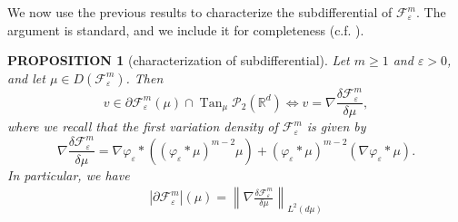 \documentclass[11pt,leqno]{amsart}
\newtheorem{prop}[thm]{PROPOSITION}
\theoremstyle{definition}
\newcommand{\be}{\begin{equation}}
\newcommand{\ee}{\end{equation}}
\newcommand{\bes}{\begin{equation*}}
\newcommand{\ees}{\end{equation*}}
\newcommand{\R}{{\mathord{\mathbb R}}}
\newcommand{\grad}{\nabla}
\newcommand{\F}{\mathcal{F}}
\def\P{{\mathcal P}}
\def\e{\varepsilon}
\def\F{\mathcal{F}}
\DeclareMathOperator{\Tan}{Tan}
\begin{document}

We now use the previous results to characterize the subdifferential of $\F^m_\e$. The argument is standard, and we include it for completeness (c.f. \cite{JKO, 5person, AGS}).
\begin{prop}[characterization of subdifferential] \label{subdiffchar}
	Let $m \geq 1$ and $\e >0$, and let $\mu \in D(\F_\e^m)$. Then
\bes
	v \in \partial \F^m_\e(\mu) \cap \Tan_\mu\P_2(\R^d) \iff v = \grad \frac{\delta \F_\e^m}{\delta \mu},
\ees
where we recall that the first variation density of $\F_\e^m$ is given by
\be \label{subdiffform} 
	\grad \frac{\delta \F_\e^m}{\delta \mu} = \grad \varphi_\e* \left((\varphi_\e*\mu)^{m-2} \mu \right) + (\varphi_\e* \mu)^{m-2} (\grad \varphi_\e * \mu).
\ee
In particular, we have
\begin{align*}
|\partial \F^m_\e|(\mu) = \left\|\grad \frac{\delta \F_\e^m}{\delta \mu} \right\|_{L^2(d \mu)}
\end{align*}
\end{prop}
\end{document}
